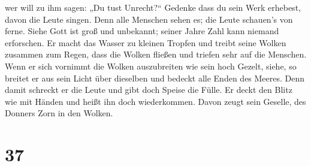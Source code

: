 wer will zu ihm sagen: „Du tust Unrecht?{}``  Gedenke
dass du sein Werk erhebest, davon die Leute singen.  Denn
alle Menschen sehen es; die Leute schauen's von ferne. 
Siehe Gott ist groß und unbekannt; seiner Jahre Zahl kann niemand
erforschen.  Er macht das Wasser zu kleinen Tropfen und
treibt seine Wolken zusammen zum Regen,  dass die Wolken
fließen und triefen sehr auf die Menschen.  Wenn er sich
vornimmt die Wolken auszubreiten wie sein hoch Gezelt, 
siehe, so breitet er aus sein Licht über dieselben und bedeckt alle
Enden des Meeres.  Denn damit schreckt er die Leute und
gibt doch Speise die Fülle.  Er deckt den Blitz wie mit
Händen und heißt ihn doch wiederkommen.  Davon zeugt sein
Geselle, des Donners Zorn in den Wolken.

\hypertarget{section-36}{%
\section{37}\label{section-36}}

